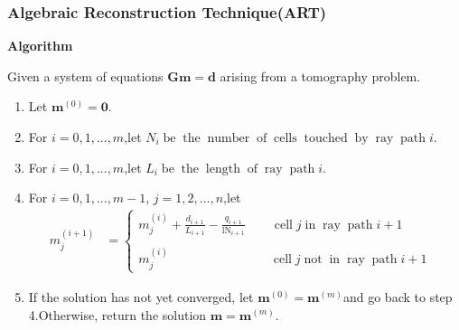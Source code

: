 \documentclass[a4paper]{article}
\newcommand{\tmmathbf}[1]{\ensuremath{\boldsymbol{#1}}}
\newcommand{\tmop}[1]{\ensuremath{\operatorname{#1}}}
\newcommand{\tmtextbf}[1]{{\bfseries{#1}}}
\newcommand{\tmtextup}[1]{{\upshape{#1}}}
\newenvironment{enumeratenumeric}{\begin{enumerate}[1.] }{\end{enumerate}}
\newenvironment{tmindent}{\begin{tmparmod}{1.5em}{0pt}{0pt} }{\end{tmparmod}}
\newenvironment{tmparmod}[3]{\begin{list}{}{\setlength{\topsep}{0pt}\setlength{\leftmargin}{#1}\setlength{\rightmargin}{#2}\setlength{\parindent}{#3}\setlength{\listparindent}{\parindent}\setlength{\itemindent}{\parindent}\setlength{\parsep}{\parskip}} \item[]}{\end{list}}
\newenvironment{tmparsep}[1]{\begingroup\setlength{\parskip}{#1}}{\endgroup}
\begin{document}
\subsubsection{Algebraic Reconstruction Technique(ART)}

{\noindent}\begin{tmparsep}{0em}
  \tmtextbf{Algorithm \tmtextup{2}}{\smallskip}
  \begin{tmindent}
    Given a system of equations $\tmmathbf{G}\tmmathbf{m}=\tmmathbf{d}$
    arising from a tomography problem.
    \begin{enumeratenumeric}
      \item Let $\tmmathbf{m}^{(0)} =\tmmathbf{0}$.

      \item For $i = 0, 1, ..., m$,let $N_i \tmop{be} \tmop{the} \tmop{number}
      \tmop{of} \tmop{cells} \tmop{touched} \tmop{by} \tmop{ray} \tmop{path}
      i.$

      \item For $i = 0, 1, ..., m$,let $L_i \tmop{be} \tmop{the} \tmop{length}
      \tmop{of} \tmop{ray} \tmop{path} i.$

      \item For $i = 0, 1, ..., m - 1$, $j = 1, 2, \ldots, n$,let
      \begin{eqnarray}
        m_j^{\left( i + 1 \right)} & = \left\{ \begin{array}{l}
          m_j^{\left( i \right)} + \frac{d_{i + 1}}{L_{i + 1}} - \frac{q_{i +
          1}}{\tmop{lN}_{i + 1}}  \hspace{2em} \tmop{cell} j \tmop{in}
          \tmop{ray} \tmop{path} i + 1\\
          \\
          m_j^{\left( i \right)}  \hspace{2em} \hspace{2em} \hspace{2em}
          \hspace{2em} \tmop{cell} j \tmop{not} \tmop{in} \tmop{ray}
          \tmop{path} i + 1
        \end{array} \right. &
      \end{eqnarray}
      \item If the solution has not yet converged, let $\tmmathbf{m}^{(0)}
      =\tmmathbf{m}^{\left( m \right)} $and go back to step 4.Otherwise,
      return the solution $\tmmathbf{m}=\tmmathbf{m}^{\left( m \right)} .$
    \end{enumeratenumeric}
  \end{tmindent}
\end{tmparsep}{\hspace*{\fill}}{\medskip}
\end{document}
